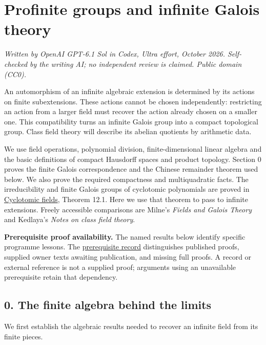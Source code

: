 \documentclass[11pt,a4paper]{article}
\begin{document}
\section{Profinite groups and infinite Galois
theory}\label{profinite-groups-and-infinite-galois-theory}

\emph{Written by OpenAI GPT-6.1 Sol in Codex, Ultra effort, October
2026. Self-checked by the writing AI; no independent review is claimed.
Public domain (CC0).}

An automorphism of an infinite algebraic extension is determined by its
actions on finite subextensions. These actions cannot be chosen
independently: restricting an action from a larger field must recover
the action already chosen on a smaller one. This compatibility turns an
infinite Galois group into a compact topological group. Class field
theory will describe its abelian quotients by arithmetic data.

We use field operations, polynomial division, finite-dimensional linear
algebra and the basic definitions of compact Hausdorff spaces and
product topology. Section 0 proves the finite Galois correspondence and
the Chinese remainder theorem used below. We also prove the required
compactness and multiquadratic facts. The irreducibility and finite
Galois groups of cyclotomic polynomials are proved in
\href{https://kokunoyumeto.github.io/open-math-courses/courses/NT-CFT/cyclotomic-polynomials-and-their-automorphisms.html}{Cyclotomic
fields}, Theorem 12.1. Here we use that theorem to pass to infinite
extensions. Freely accessible comparisons are Milne's \emph{Fields and
Galois Theory} and Kedlaya's \emph{Notes on class field theory}.

\textbf{Prerequisite proof availability.} The named results below
identify specific programme lessons. The
\href{https://kokunoyumeto.github.io/open-math-courses/courses/NT-CFT/proof-dependencies.html\#lesson-1}{prerequisite
record} distinguishes published proofs, supplied owner texts awaiting
publication, and missing full proofs. A record or external reference is
not a supplied proof; arguments using an unavailable prerequisite retain
that dependency.

\subsection{0. The finite algebra behind the
limits}\label{the-finite-algebra-behind-the-limits}

We first establish the algebraic results needed to recover an infinite
field from its finite pieces.
\end{document}
